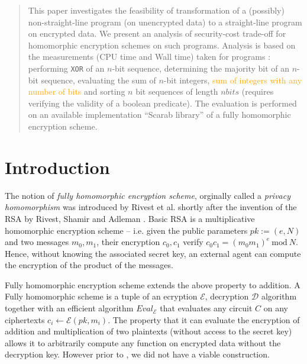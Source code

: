 \documentclass{acm_proc_article-sp}
\begin{document}
\date{30 July 1999}
\maketitle
\begin{abstract}
This paper investigates the feasibility of transformation of a (possibly) non-straight-line program (on unencrypted data) to a straight-line program on encrypted data. We present an analysis of security-cost trade-off for homomorphic encryption schemes on such programs. Analysis is based on the measurements (CPU time and  Wall time) taken for programs : performing \texttt{XOR} of an $n$-bit sequence, determining the majority bit of an $n$-bit sequence, evaluating the sum of $n$-bit integers, \textcolor{orange}{sum of integers with any number of bits} and sorting $n$ bit sequences of length $nbits$ (requires verifying the validity of a boolean predicate). The evaluation is performed on an available implementation ``Scarab library'' of a fully homomorphic encryption scheme. 

\end{abstract}


\section{Introduction}

The notion of \textit{fully homomorphic encryption scheme}, orginally called a \textit{privacy homomorphism} was introduced by Rivest et al. \cite{rivest78} shortly after the invention of the RSA by Rivest, Shamir and Adleman \cite{Rivest78amethod}.  Basic RSA is a multiplicative homomorphic encryption scheme -- i.e. given the public parameters $pk:=(e, N)$ and two messages $m_0, m_1$, their encryption $c_0, c_1$ verify $c_0c_1=(m_0m_1)^e \ \textrm {mod}\ N$. Hence, without knowing the associated secret key, an external agent can compute the encryption of the product of the messages.

Fully homomorphic encryption scheme extends the above property to addition. A Fully homomorphic scheme is a tuple of an ecryption $\mathcal{E}$, decryption $\mathcal{D}$ algorithm together with an efficient algorithm $Eval_\mathcal{E}$ that evaluates any circuit $C$ on any ciphertexts $c_i \leftarrow \mathcal{E}(pk, m_i)$. The property that it can evaluate the encryption of addition and multiplication of two plaintexts (without access to the secret key) allows it to arbitrarily compute any function on encrypted data without the decryption key. However prior to \cite{homenc}, we did not have a viable construction.
\end{document}
